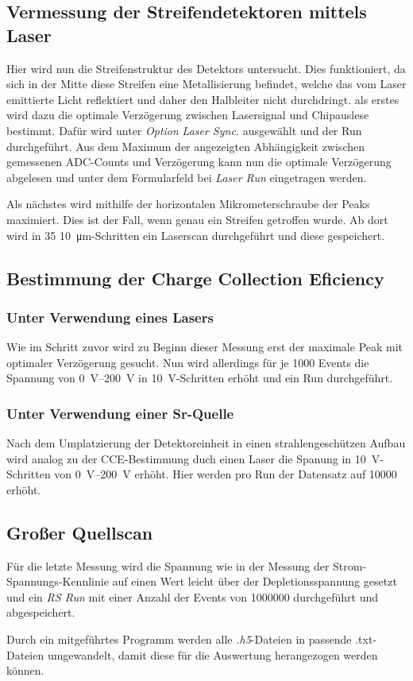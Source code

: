 \subsection{Vermessung der Streifendetektoren mittels Laser}
\label{sec:Vermessung_Laser}
Hier wird nun die Streifenstruktur des Detektors untersucht. Dies funktioniert,
da sich in der Mitte diese Streifen eine Metallisierung befindet, welche das vom
Laser emittierte Licht reflektiert und daher den Halbleiter nicht durchdringt.
als erstes wird dazu die optimale Verzögerung zwischen Lasersignal und Chipauslese
bestimmt. Dafür wird unter \textit{Option} \textit{Laser Sync.} ausgewählt und
der Run durchgeführt. Aus dem Maximum der angezeigten Abhängigkeit zwischen
gemessenen ADC-Counts und Verzögerung kann nun die optimale Verzögerung abgelesen
und unter dem Formularfeld bei \textit{Laser Run} eingetragen werden.

Als nächstes wird mithilfe der horizontalen Mikrometerschraube der Peaks maximiert.
Dies ist der Fall, wenn genau ein Streifen getroffen wurde. Ab dort wird in \num{35}
\SI{10}{\micro\meter}-Schritten ein Laserscan durchgeführt und diese gespeichert.


\subsection{Bestimmung der Charge Collection Eficiency}
\label{sec:CCE}
\subsubsection{Unter Verwendung eines Lasers}
Wie im Schritt zuvor wird zu Beginn dieser Messung erst der maximale Peak mit
optimaler Verzögerung gesucht. Nun wird allerdings für je \num{1000} Events die
Spannung von \SIrange{0}{200}{\volt} in \SI{10}{\volt}-Schritten erhöht und ein
Run durchgeführt.

\subsubsection{Unter Verwendung einer Sr-Quelle}
Nach dem Umplatzierung der Detektoreinheit in einen strahlengeschützen Aufbau wird
analog zu der CCE-Bestimmung duch einen Laser die Spanung in \SI{10}{\volt}-Schritten
von \SIrange{0}{200}{\volt} erhöht. Hier werden pro Run der Datensatz auf \num{10000}
erhöht.

\subsection{Großer Quellscan}
\label{sec:Quellscan}
Für die letzte Messung wird die Spannung wie in der Messung der Strom-Spannungs-Kennlinie
auf einen Wert leicht über der Depletionsspannung gesetzt und ein \textit{RS Run} mit
einer Anzahl der Events von \num{1000000} durchgeführt und abgespeichert.

Durch ein mitgeführtes Programm werden alle \textit{.h5}-Dateien in passende .txt-Dateien umgewandelt, damit diese für die Auswertung herangezogen werden können.
